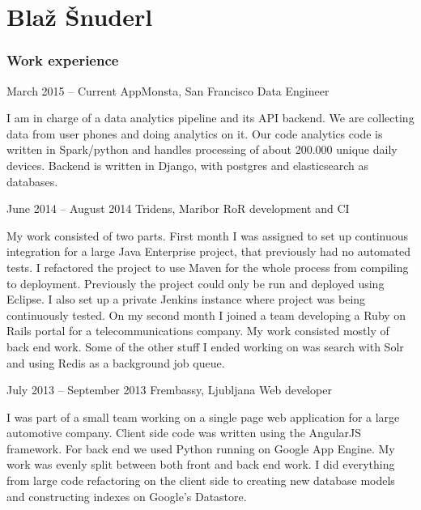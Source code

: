 \documentclass{tccv}
\begin{document}
\part{Blaž Šnuderl}

\section{Work experience}

\begin{eventlist}

\item{March 2015 -- Current}
     {AppMonsta, San Francisco}
     {Data Engineer}

I am in charge of a data analytics pipeline and its API backend. We are collecting data from user phones and doing analytics on it. Our code analytics code is written in Spark/python and handles processing of about 200.000 unique daily devices. Backend is written in Django, with postgres and elasticsearch as databases.

\newline

\item{June 2014 -- August 2014}
     {Tridens, Maribor}
     {RoR development and CI}

My work consisted of two parts. First month I was assigned to set up continuous integration for a large Java Enterprise project, that previously had no automated tests. I refactored the project to use Maven for the whole process from compiling to deployment. Previously the project could only be run and deployed using Eclipse. I also set up a private Jenkins instance where project was being continuously tested. 
\newline
On my second month I joined a team developing a Ruby on Rails portal for a telecommunications company. My work consisted mostly of back end work. Some of the other stuff I ended working on was search with Solr and using Redis as a background job queue.

\item{July 2013 -- September 2013}
     {Frembassy, Ljubljana}
     {Web developer}
     
I was part of a small team working on a single page web application for a large automotive company. Client side code was written using the AngularJS framework. For back end we used Python running on Google App Engine. My work was evenly split between both front and back end work. I did everything from large code refactoring on the client side to creating new database models and constructing indexes on Google's Datastore.

\end{eventlist}
\end{document}
